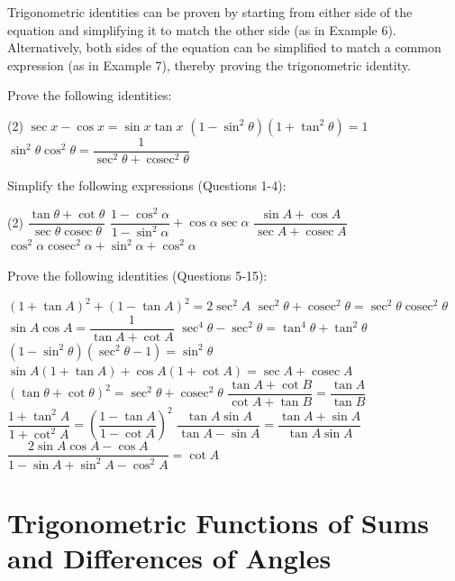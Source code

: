 \documentclass{report}
\begin{document}
\newpage
Trigonometric identities can be proven by starting from either side of the equation and simplifying it to match the other side (as in Example 6). Alternatively, both sides of the equation can be simplified to match a common expression (as in Example 7), thereby proving the trigonometric identity.

Prove the following identities:
\begin{tasks}[label=\arabic*.](2)
	\task $\sec x-\cos x=\sin x \tan x$
	\task $\left(1-\sin ^2 \theta\right)\left(1+\tan ^2 \theta\right)=1$
	\task $\sin ^2 \theta \cos ^2 \theta=\dfrac{1}{\sec ^2 \theta+\operatorname{cosec}^2 \theta}$
\end{tasks}

Simplify the following expressions (Questions 1-4):
\begin{tasks}[label=\arabic*.](2)
	\task $\dfrac{\tan \theta+\cot \theta}{\sec \theta \operatorname{cosec} \theta}$
	\task $\dfrac{1-\cos ^2 \alpha}{1-\sin ^2 \alpha}+\cos \alpha \sec \alpha$
	\task $\dfrac{\sin A+\cos A}{\sec A+\operatorname{cosec} A}$
	\task $\cos ^2 \alpha \operatorname{cosec}^2 \alpha+\sin ^2 \alpha+\cos ^2 \alpha$
\end{tasks}

\noindent Prove the following identities (Questions 5-15):
\begin{tasks}[label=\arabic*.,start=5]
	\task $(1+\tan A)^2+(1-\tan A)^2=2 \sec ^2 A$
	\task $\sec ^2 \theta+\operatorname{cosec}^2 \theta=\sec ^2 \theta \operatorname{cosec}^2 \theta$
	\task $\sin A \cos A=\dfrac{1}{\tan A+\cot A}$
	\task $\sec ^4 \theta-\sec ^2 \theta=\tan ^4 \theta+\tan ^2 \theta$
	\task $\left(1-\sin ^2 \theta\right)\left(\sec ^2 \theta-1\right)=\sin ^2 \theta$
	\task $\sin A(1+\tan A)+\cos A(1+\cot A)=\sec A+\operatorname{cosec} A$
	\task $(\tan \theta+\cot \theta)^2=\sec ^2 \theta+\operatorname{cosec}^2 \theta$
	\task $\dfrac{\tan A+\cot B}{\cot A+\tan B}=\dfrac{\tan A}{\tan B}$
	\task $\dfrac{1+\tan ^2 A}{1+\cot ^2 A}=\left(\dfrac{1-\tan A}{1-\cot A}\right)^2$
	\task $\dfrac{\tan A \sin A}{\tan A-\sin A}=\dfrac{\tan A+\sin A}{\tan A \sin A}$
	\task $\dfrac{2 \sin A \cos A-\cos A}{1-\sin A+\sin ^2 A-\cos ^2 A}=\cot A$
\end{tasks}

\section{Trigonometric Functions of Sums and Differences of Angles}
\end{document}

